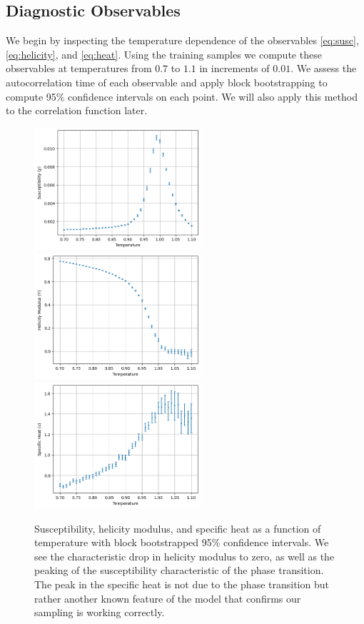 \documentclass[12pt]{article}
\begin{document}
\subsection{Diagnostic Observables}

We begin by inspecting the temperature dependence of the observables \ref{eq:susc}, \ref{eq:helicity}, and \ref{eq:heat}. Using the training samples we compute
these observables at temperatures from $0.7$ to $1.1$ in increments of $0.01$. We assess the autocorrelation time of each observable and apply block bootstrapping \cite{10.1214/aos/1176347265}
to compute 95\% confidence intervals on each point. We will also apply this method to the correlation function later.

\begin{figure}
	\centering
	\includegraphics[width=0.55\textwidth]{figures/obs/susc.png}
	\includegraphics[width=0.55\textwidth]{figures/obs/helicity.png}
	\includegraphics[width=0.55\textwidth]{figures/obs/heat_capacity.png}
	\caption[Diagnostic observables]{Susceptibility, helicity modulus, and specific heat as a function of temperature with block bootstrapped 95\% confidence intervals.
	We see the characteristic drop in helicity modulus to zero, as well as the peaking of the susceptibility characteristic of the phase transition. The peak
	in the specific heat is not due to the phase transition but rather another known feature of the model that confirms our sampling is working correctly.}
	\label{fig:observables}
\end{figure}
\end{document}
